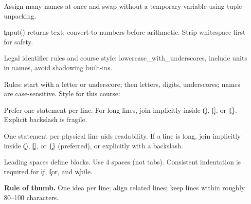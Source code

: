 Assign many names at once and swap without a temporary variable using tuple unpacking.



\c{input()} returns text; convert to numbers before arithmetic. Strip whitespace first for safety.



Legal identifier rules and course style: lowercase\_with\_underscores, include units in names, avoid shadowing built-ins.


Rules: start with a letter or underscore; then letters, digits, underscores; names are case-sensitive. Style for this course:



Prefer one statement per line. For long lines, join implicitly inside \c{()}, \c{[]}, or \c{\{\}}. Explicit backslash is fragile.


One statement per physical line aids readability. If a line is long, join implicitly inside \c{()}, \c{[]}, or \c{\{\}} (preferred), or explicitly with a backslash.


Leading spaces define blocks. Use 4 spaces (not tabs). Consistent indentation is required for \c{if}, \c{for}, and \c{while}.

\begin{NoteBox}
\textbf{Rule of thumb.} One idea per line; align related lines; keep lines within roughly 80--100 characters.
\end{NoteBox}

